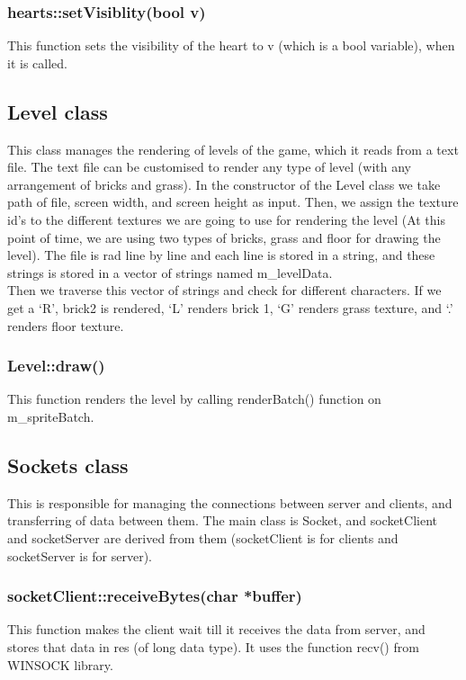 \documentclass{article}
\begin{document}
\subsubsection{hearts::setVisiblity(bool v) }
This function sets the visibility of the heart to v (which is a bool variable), when it is called.
\newline

\subsection{Level class}
This class manages the rendering of levels of the game, which it reads from a text file. The text file can be customised to render any type of level (with any arrangement of bricks and grass). 
In the constructor of the Level class we take path of file, screen width, and screen height as input. Then, we assign the texture id’s to the different textures we are going to use for rendering the level (At this point of time, we are using two types of bricks, grass and floor for drawing the level). The file is rad line by line and each line is stored in a string, and these strings is stored in a vector of strings named m\_levelData. \\ 

Then we traverse this vector of strings and check for different characters. If we get a ‘R’, brick2 is rendered, ‘L’ renders brick 1, ‘G’ renders grass texture, and ‘.’ renders floor texture. \\
\newline

\subsubsection{Level::draw()}
This function renders the level by calling renderBatch() function on m\_spriteBatch. \newline

\subsection{Sockets class}
This is responsible for managing the connections between server and clients, and transferring of data between them. The main class is Socket, and socketClient and socketServer are derived from them (socketClient is for clients and socketServer is for server).
\newline

\subsubsection{socketClient::receiveBytes(char *buffer)}
This function makes the client wait till it receives the data from server, and stores that data in res (of long data type). It uses the function recv() from WINSOCK library.
\newline
\end{document}
